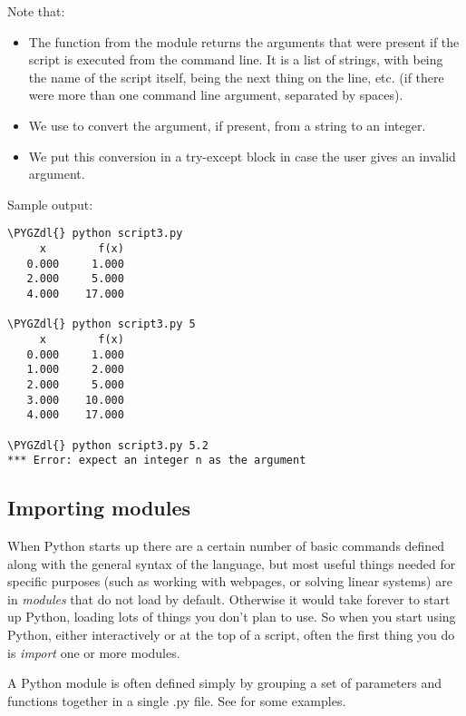 \documentclass[letterpaper,10pt,english]{sphinxmanual}
\def\PYGZdl{\char`\$}
\begin{document}
Note that:
\begin{itemize}
\item {} 
The function  from the  module returns the arguments that
were present if the script is executed from the command line.  It is a
list of strings, with  being the name of the script itself,
 being the next thing on the line, etc. (if there were more
than one command line argument, separated by spaces).

\item {} 
We use  to convert the argument, if present, from a
string to an integer.

\item {} 
We put this conversion in a try-except block in case the user gives an
invalid argument.

\end{itemize}

Sample output:

\begin{Verbatim}[commandchars=\\\{\}]
\PYGZdl{} python script3.py
     x        f(x)
   0.000     1.000
   2.000     5.000
   4.000    17.000

\PYGZdl{} python script3.py 5
     x        f(x)
   0.000     1.000
   1.000     2.000
   2.000     5.000
   3.000    10.000
   4.000    17.000

\PYGZdl{} python script3.py 5.2
*** Error: expect an integer n as the argument
\end{Verbatim}


\subsection{Importing modules}
\label{python_scripts_modules:importing-modules}\label{python_scripts_modules:id1}
When Python starts up there are a certain number of basic commands defined
along with the general syntax of the language, but most useful things needed
for specific purposes (such as working with webpages, or solving linear
systems) are in \emph{modules} that do not load by default.  Otherwise it would
take forever to start up Python, loading lots of things you don't plan to
use.  So when you start using Python, either interactively or at the top of
a script, often the  first thing you do is \emph{import} one or more modules.

A Python module is often defined simply by grouping a set of parameters and
functions together in a single .py file.
See {\hyperref[python_scripts_modules:python\string-scripts\string-modules]{}} for some examples.
\end{document}

